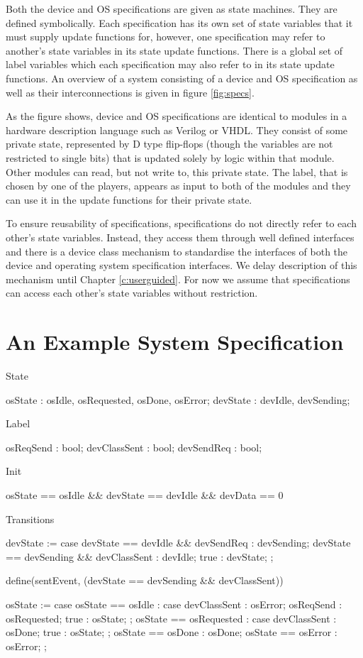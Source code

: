 Both the device and OS specifications are given as state machines. They are defined symbolically. Each specification has its own set of state variables that it must supply update functions for, however, one specification may refer to another's state variables in its state update functions. There is a global set of label variables which each specification may also refer to in its state update functions. An overview of a system consisting of a device and OS specification as well as their interconnections is given in figure \ref{fig:specs}.

As the figure shows, device and OS specifications are identical to modules in a hardware description language such as Verilog or VHDL. They consist of some private state, represented by D type flip-flops (though the variables are not restricted to single bits) that is updated solely by logic within that module. Other modules can read, but not write to, this private state. The label, that is chosen by one of the players, appears as input to both of the modules and they can use it in the update functions for their private state.

To ensure reusability of specifications, specifications do not directly refer to each other's state variables. Instead, they access them through well defined interfaces and there is a device class mechanism to standardise the interfaces of both the device and operating system specification interfaces. We delay description of this mechanism until Chapter \ref{c:userguided}. For now we assume that specifications can access each other's state variables without restriction.

\section{An Example System Specification}

\begin{asllisting}
State

osState  : {osIdle, osRequested, osDone, osError};
devState : {devIdle, devSending};

Label

osReqSend    : bool;
devClassSent : bool;
devSendReq   : bool;

Init

osState == osIdle && devState == devIdle && devData == 0

Transitions

devState := case {
    devState == devIdle    && devSendReq   : devSending;
    devState == devSending && devClassSent : devIdle;
    true                                   : devState;
};

define(sentEvent, (devState == devSending && devClassSent))
 
osState := case {
    osState == osIdle :
        case {
            devClassSent : osError;
            osReqSend    : osRequested;
            true         : osState;
        };
    osState == osRequested :
        case {
            devClassSent : osDone;
            true         : osState;
        };
    osState == osDone  : osDone;
    osState == osError : osError;
};
\end{asllisting}

